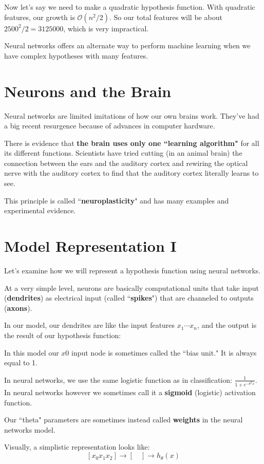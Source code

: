 Now let's say we need to make a quadratic hypothesis function. With quadratic features, our growth is $\mathcal{O}(n^2/2)$. So our total features will be about $2500^2 / 2 = 3125000 $, which is very impractical.

Neural networks offers an alternate way to perform machine learning when we have complex hypotheses with many features.

\section{Neurons and the Brain}

Neural networks are limited imitations of how our own brains work. They've had a big recent resurgence because of advances in computer hardware.

There is evidence that \textbf{the brain uses only one ``learning algorithm"} for all its different functions. Scientists have tried cutting (in an animal brain) the connection between the ears and the auditory cortex and rewiring the optical nerve with the auditory cortex to find that the auditory cortex literally learns to see.

This principle is called ``\textbf{neuroplasticity}" and has many examples and experimental evidence.

\section{Model Representation I}
Let's examine how we will represent a hypothesis function using neural networks.

At a very simple level, neurons are basically computational units that take input (\textbf{dendrites}) as electrical input (called ``\textbf{spikes}") that are channeled to outputs (\textbf{axons}).

In our model, our dendrites are like the input features $x_1\cdots x_n$, and the output is the result of our hypothesis function:

In this model our $x0$ input node is sometimes called the ``bias unit." It is always equal to 1.

In neural networks, we use the same logistic function as in classification: $\frac{1}{1 + e^{-\theta^Tx}} $. In neural networks however we sometimes call it a \textbf{sigmoid} (logistic) activation function.

Our ``theta" parameters are sometimes instead called \textbf{weights} in the neural networks model.

Visually, a simplistic representation looks like:
\[ [x_0x_1x_2]\rightarrow [\quad] \rightarrow h_\theta (x) \]
